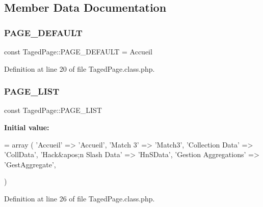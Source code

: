 \subsection{Member Data Documentation}
\mbox{\label{class_taged_page_a9083797ee4743765a6db47c72715a419}} 
\subsubsection{\texorpdfstring{P\+A\+G\+E\+\_\+\+D\+E\+F\+A\+U\+LT}{PAGE\_DEFAULT}}
{\footnotesize\ttfamily const Taged\+Page\+::\+P\+A\+G\+E\+\_\+\+D\+E\+F\+A\+U\+LT = \textquotesingle{}Accueil\textquotesingle{}}



Definition at line 20 of file Taged\+Page.\+class.\+php.

\mbox{\label{class_taged_page_ab1165c7973c632c2c70a5083c241d7c0}} 
\subsubsection{\texorpdfstring{P\+A\+G\+E\+\_\+\+L\+I\+ST}{PAGE\_LIST}}
{\footnotesize\ttfamily const Taged\+Page\+::\+P\+A\+G\+E\+\_\+\+L\+I\+ST}

{\bfseries Initial value\+:}
\begin{DoxyCode}
= array (
        \textcolor{stringliteral}{'Accueil'} => \textcolor{stringliteral}{'Accueil'},
        \textcolor{stringliteral}{'Match 3'} => \textcolor{stringliteral}{'Match3'},
        \textcolor{stringliteral}{'Collection Data'} => \textcolor{stringliteral}{'CollData'},
        \textcolor{stringliteral}{'Hack&apos;n Slash Data'} => \textcolor{stringliteral}{'HnSData'},
        \textcolor{stringliteral}{'Gestion Aggregations'} => \textcolor{stringliteral}{'GestAggregate'},








    )
\end{DoxyCode}


Definition at line 26 of file Taged\+Page.\+class.\+php.


